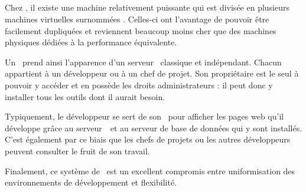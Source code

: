 \subsection{\avservers}

Chez \asl, il existe une machine relativement puissante qui est divisée en plusieurs machines virtuelles surnommées \avservers. Celles-ci ont l'avantage de pouvoir être facilement dupliquées et reviennent beaucoup moins cher que des machines physiques dédiées à la performance équivalente. 

Un \avserver\ prend ainsi l'apparence d'un serveur \alinux\ classique et in\-dé\-pen\-dant. Chacun appartient à un développeur ou à un chef de projet. Son propriétaire est le seul à pouvoir y accéder et en possède les droits administrateurs : il peut donc y installer tous les outils dont il aurait besoin.

Typiquement, le développeur se sert de son \avserver\ pour afficher les pages web qu'il développe grâce au serveur~\ahttp\ et au serveur de base de données qui y sont installés. C'est également par ce biais que les chefs de projets ou les autres développeurs peuvent consulter le fruit de son travail.

Finalement, ce système de \avservers\ est un excellent compromis entre uniformisation des environnements de développement et flexibilité.
